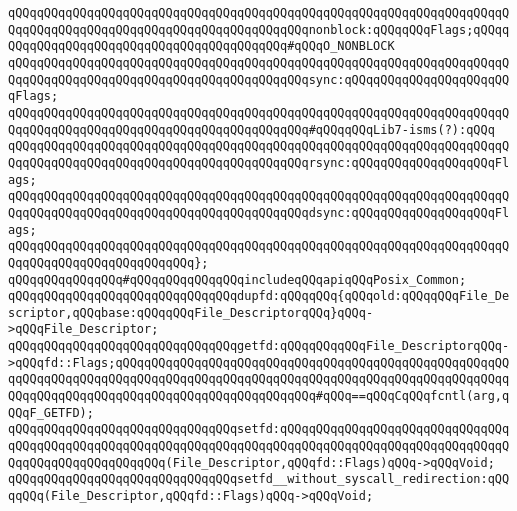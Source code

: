 \verb|qQQqqQQqqQQqqQQqqQQqqQQqqQQqqQQqqQQqqQQqqQQqqQQqqQQqqQQqqQQqqQQqqQQqqQQqqQQqqQQqqQQqqQQqqQQqqQQqqQQqqQQqqQQqqQQqnonblock:qQQqqQQqFlags;qQQqqQQqqQQqqQQqqQQqqQQqqQQqqQQqqQQqqQQqqQQq#qQQqO_NONBLOCK|\newline
\verb|qQQqqQQqqQQqqQQqqQQqqQQqqQQqqQQqqQQqqQQqqQQqqQQqqQQqqQQqqQQqqQQqqQQqqQQqqQQqqQQqqQQqqQQqqQQqqQQqqQQqqQQqqQQqqQQqsync:qQQqqQQqqQQqqQQqqQQqqQQqFlags;|\newline
\newline
\verb|qQQqqQQqqQQqqQQqqQQqqQQqqQQqqQQqqQQqqQQqqQQqqQQqqQQqqQQqqQQqqQQqqQQqqQQqqQQqqQQqqQQqqQQqqQQqqQQqqQQqqQQqqQQqqQQq#qQQqqQQqLib7-isms(?):qQQq|\newline
\verb|qQQqqQQqqQQqqQQqqQQqqQQqqQQqqQQqqQQqqQQqqQQqqQQqqQQqqQQqqQQqqQQqqQQqqQQqqQQqqQQqqQQqqQQqqQQqqQQqqQQqqQQqqQQqqQQqrsync:qQQqqQQqqQQqqQQqqQQqFlags;|\newline
\verb|qQQqqQQqqQQqqQQqqQQqqQQqqQQqqQQqqQQqqQQqqQQqqQQqqQQqqQQqqQQqqQQqqQQqqQQqqQQqqQQqqQQqqQQqqQQqqQQqqQQqqQQqqQQqqQQqdsync:qQQqqQQqqQQqqQQqqQQqFlags;|\newline
\verb|qQQqqQQqqQQqqQQqqQQqqQQqqQQqqQQqqQQqqQQqqQQqqQQqqQQqqQQqqQQqqQQqqQQqqQQqqQQqqQQqqQQqqQQqqQQqqQQq};|\newline
\newline
\verb|qQQqqQQqqQQqqQQq#qQQqqQQqqQQqqQQqincludeqQQqapiqQQqPosix_Common;|\newline
\newline
\verb|qQQqqQQqqQQqqQQqqQQqqQQqqQQqqQQqdupfd:qQQqqQQq{qQQqold:qQQqqQQqFile_Descriptor,qQQqbase:qQQqqQQqFile_DescriptorqQQq}qQQq->qQQqFile_Descriptor;|\newline
\newline
\verb|qQQqqQQqqQQqqQQqqQQqqQQqqQQqqQQqgetfd:qQQqqQQqqQQqFile_DescriptorqQQq->qQQqfd::Flags;qQQqqQQqqQQqqQQqqQQqqQQqqQQqqQQqqQQqqQQqqQQqqQQqqQQqqQQqqQQqqQQqqQQqqQQqqQQqqQQqqQQqqQQqqQQqqQQqqQQqqQQqqQQqqQQqqQQqqQQqqQQqqQQqqQQqqQQqqQQqqQQqqQQqqQQqqQQqqQQqqQQqqQQq#qQQq==qQQqCqQQqfcntl(arg,qQQqF_GETFD);|\newline
\newline
\verb|qQQqqQQqqQQqqQQqqQQqqQQqqQQqqQQqsetfd:qQQqqQQqqQQqqQQqqQQqqQQqqQQqqQQqqQQqqQQqqQQqqQQqqQQqqQQqqQQqqQQqqQQqqQQqqQQqqQQqqQQqqQQqqQQqqQQqqQQqqQQqqQQqqQQqqQQqqQQqqQQq(File_Descriptor,qQQqfd::Flags)qQQq->qQQqVoid;|\newline
\verb|qQQqqQQqqQQqqQQqqQQqqQQqqQQqqQQqsetfd__without_syscall_redirection:qQQqqQQq(File_Descriptor,qQQqfd::Flags)qQQq->qQQqVoid;|\newline
\newline
